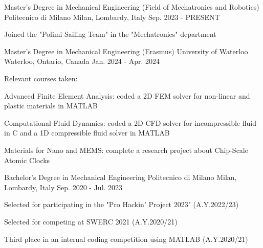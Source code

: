 

\begin{cventries}

  \cventry
  {Master's Degree in Mechanical Engineering (Field of Mechatronics and Robotics)} %
  {Politecnico di Milano} %
  {Milan, Lombardy, Italy} %
  {Sep. 2023 - PRESENT} %
  {
    \begin{cvitems} %
      \item {Joined the "Polimi Sailing Team" in the "Mechatronics" department}
    \end{cvitems}
  }


  \cventry
  {Master's Degree in Mechanical Engineering (Erasmus)} %
  {University of Waterloo} %
  {Waterloo, Ontario, Canada} %
  {Jan. 2024 - Apr. 2024} %
  {
    Relevant courses taken:
    \vspace{4mm}
    \begin{cvitems} %
      \item {Advanced Finite Element Analysis: coded a 2D FEM solver for non-linear and plastic materials in MATLAB}
      \item {Computational Fluid Dynamics: coded a 2D CFD solver for incompressible fluid in C and a 1D compressible fluid solver in MATLAB}
      \item {Materials for Nano and MEMS: complete a research project about Chip-Scale Atomic Clocks}
    \end{cvitems}
  }


  \cventry
  {Bachelor's Degree in Mechanical Engineering} %
  {Politecnico di Milano} %
  {Milan, Lombardy, Italy} %
  {Sep. 2020 - Jul. 2023} %
  {
    \begin{cvitems} %
      \item {Selected for participating in the "Pro Hackin' Project 2023" (A.Y.2022/23)}
      \item {Selected for competing at SWERC 2021 (A.Y.2020/21)}
      \item {Third place in an internal coding competition using MATLAB (A.Y.2020/21)}
    \end{cvitems}
  }


\end{cventries}

